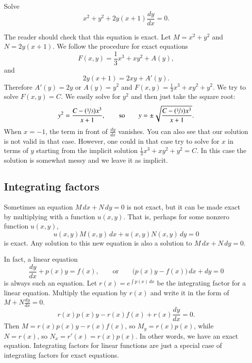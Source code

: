 \documentclass[12pt]{book}
\begin{document}
\begin{example} \label{exact:exampleabove}
Solve
\begin{equation*}
x^2+y^2 + 2y(x+1) \frac{dy}{dx} = 0 .
\end{equation*}

The reader should check that this equation is exact.
Let $M= x^2+y^2$ and $N=2y(x+1)$.
We follow the procedure for exact equations
\begin{equation*}
F(x,y) = \frac{1}{3}x^3 + xy^2 + A(y) ,
\end{equation*}
and
\begin{equation*}
2y(x+1) = 2xy + A'(y) .
\end{equation*}
Therefore $A'(y) = 2y$ or $A(y) = y^2$ and $F(x,y) = \frac{1}{3}x^3 + xy^2 +
y^2$.
We try to solve $F(x,y) = C$.  We easily solve for $y^2$ and then just take
the square root:
\begin{equation*}
y^2 = \frac{C-(\nicefrac{1}{3})x^3}{x+1},
\qquad \text{so} \qquad
y = \pm \sqrt{\frac{C-(\nicefrac{1}{3})x^3}{x+1}} .
\end{equation*}
When $x=-1$, the term in front of $\frac{dy}{dx}$ vanishes.  You can also
see that our solution is not valid in that case.  However, one could in that
case try to solve for $x$ in terms of $y$ starting from the implicit
solution $\frac{1}{3}x^3 + xy^2 + y^2 = C$.  In this case the solution is 
somewhat messy and we leave it as implicit.
\end{example}

\subsection{Integrating factors}

Sometimes an equation $M\, dx + N \, dy = 0$ is not exact, but it can be
made exact by multiplying with a function $u(x,y)$.  That is, perhaps
for some nonzero function $u(x,y)$,
\begin{equation*}
u(x,y) M(x,y) \, dx + u(x,y) N(x,y) \, dy = 0
\end{equation*}
is exact.  Any solution to this new equation is also a solution to
$M\, dx + N \, dy = 0$.

In fact, a linear equation
\begin{equation*}
\frac{dy}{dx} + p(x) y = f(x), \qquad
\text{or} \qquad
\bigl( p(x) y - f(x) \bigr)\, dx +  dy  = 0
\end{equation*}
is always such an equation.  Let $r(x) = e^{\int p(x)\,dx}$ be the
integrating factor for a linear equation.  Multiply the equation by $r(x)$
and write it in the form of $M + N \frac{dy}{dx} = 0$.
\begin{equation*}
r(x) p(x) y - r(x) f(x) + r(x) \frac{dy}{dx} = 0 .
\end{equation*}
Then $M = r(x) p(x) y - r(x) f(x)$, so
$M_y = r(x) p(x)$, while $N = r(x)$, so
$N_x = r'(x) = r(x) p(x)$.  In other words, we have an exact equation.
Integrating
factors for linear functions are just a special case of integrating
factors for exact equations.
\end{document}
